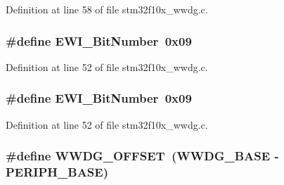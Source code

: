 Definition at line 58 of file stm32f10x\+\_\+wwdg.\+c.

\subsubsection[{\texorpdfstring{E\+W\+I\+\_\+\+Bit\+Number}{EWI_BitNumber}}]{\setlength{\rightskip}{0pt plus 5cm}\#define E\+W\+I\+\_\+\+Bit\+Number~0x09}\hypertarget{group___w_w_d_g___private___defines_ga97c9005823520f5aaefe211923b48215}{}\label{group___w_w_d_g___private___defines_ga97c9005823520f5aaefe211923b48215}


Definition at line 52 of file stm32f10x\+\_\+wwdg.\+c.

\subsubsection[{\texorpdfstring{E\+W\+I\+\_\+\+Bit\+Number}{EWI_BitNumber}}]{\setlength{\rightskip}{0pt plus 5cm}\#define E\+W\+I\+\_\+\+Bit\+Number~0x09}\hypertarget{group___w_w_d_g___private___defines_ga97c9005823520f5aaefe211923b48215}{}\label{group___w_w_d_g___private___defines_ga97c9005823520f5aaefe211923b48215}


Definition at line 52 of file stm32f10x\+\_\+wwdg.\+c.

\subsubsection[{\texorpdfstring{W\+W\+D\+G\+\_\+\+O\+F\+F\+S\+ET}{WWDG_OFFSET}}]{\setlength{\rightskip}{0pt plus 5cm}\#define W\+W\+D\+G\+\_\+\+O\+F\+F\+S\+ET~({\bf W\+W\+D\+G\+\_\+\+B\+A\+SE} -\/ {\bf P\+E\+R\+I\+P\+H\+\_\+\+B\+A\+SE})}\hypertarget{group___w_w_d_g___private___defines_gab6dcdf2385dd7317ec775e146cff40ca}{}\label{group___w_w_d_g___private___defines_gab6dcdf2385dd7317ec775e146cff40ca}


